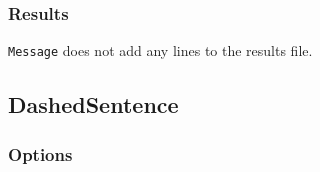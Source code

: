 \documentclass[11pt,letterpaper]{article}
\begin{document}
\normalsize

\subsubsection*{Results}

\texttt{Message} does not add any lines to the results file.

\subsection{DashedSentence}

\subsubsection*{Options}
\end{document}
